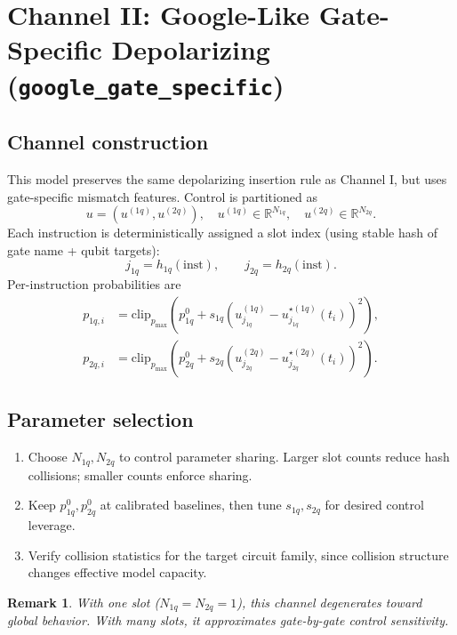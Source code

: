 \documentclass[11pt]{article}
\newtheorem{remark}{Remark}
\begin{document}
\section{Channel II: Google-Like Gate-Specific Depolarizing (\texttt{google\_gate\_specific})}

\subsection{Channel construction}
This model preserves the same depolarizing insertion rule as Channel I,
but uses gate-specific mismatch features.
Control is partitioned as
\begin{equation}
u=(u^{(1q)},u^{(2q)}),
\quad
u^{(1q)}\in\mathbb{R}^{N_{1q}},
\quad
u^{(2q)}\in\mathbb{R}^{N_{2q}}.
\end{equation}
Each instruction is deterministically assigned a slot index
(using stable hash of gate name + qubit targets):
\begin{equation}
j_{1q}=h_{1q}(\text{inst}),
\qquad
j_{2q}=h_{2q}(\text{inst}).
\end{equation}
Per-instruction probabilities are
\begin{align}
p_{1q,i}&=\mathrm{clip}_{p_{\max}}\!\left(
p_{1q}^{0}+s_{1q}\left(u^{(1q)}_{j_{1q}}-u^{\star(1q)}_{j_{1q}}(t_i)\right)^2
\right),\\
p_{2q,i}&=\mathrm{clip}_{p_{\max}}\!\left(
p_{2q}^{0}+s_{2q}\left(u^{(2q)}_{j_{2q}}-u^{\star(2q)}_{j_{2q}}(t_i)\right)^2
\right).
\label{eq:gate_specific_probs}
\end{align}

\subsection{Parameter selection}
\begin{enumerate}[label=\textbf{S\arabic*}.]
\item Choose $N_{1q},N_{2q}$ to control parameter sharing.
Larger slot counts reduce hash collisions; smaller counts enforce sharing.
\item Keep $p_{1q}^{0},p_{2q}^{0}$ at calibrated baselines,
then tune $s_{1q},s_{2q}$ for desired control leverage.
\item Verify collision statistics for the target circuit family,
since collision structure changes effective model capacity.
\end{enumerate}

\begin{remark}
With one slot ($N_{1q}=N_{2q}=1$), this channel degenerates toward global behavior.
With many slots, it approximates gate-by-gate control sensitivity.
\end{remark}
\end{document}
